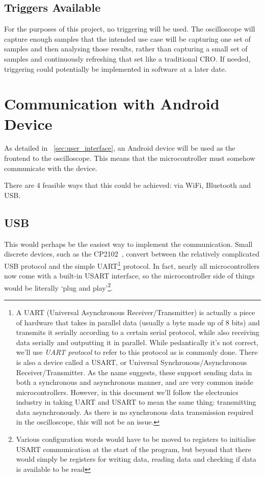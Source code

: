 \subsection*{Triggers Available}

For the purposes of this project, no triggering will be used. The oscilloscope
will capture enough samples that the intended use case will be capturing one set
of samples and then analysing those results, rather than capturing a small set
of samples and continuously refreshing that set like a traditional CRO. If
needed, triggering could potentially be implemented in software at a later date.

\section{Communication with Android Device}
\label{sec:CommOptions}

As detailed in ~\cref{sec:user_interface}, an Android device will be used as the
frontend to the oscilloscope. This means that the microcontroller must somehow
communicate with the device.

There are 4 feasible ways that this could be achieved: via WiFi, Bluetooth and
USB.

\subsection*{USB}

This would perhaps be the easiest way to implement the communication. Small
discrete devices, such as the CP2102~\autocite{CP2102}, convert between the
relatively complicated USB protocol and the simple UART\footnote{A UART
(Universal Asynchronous Receiver/Transmitter) is actually a piece of hardware
that takes in parallel data (usually a byte made up of 8 bits) and transmits it
serially according to a certain serial protocol, while also receiving data
serially and outputting it in parallel. While pedantically it's not correct,
we'll use \textit{UART protocol} to refer to this protocol as is commonly done.
There is also a device called a USART, or Universal Synchronous/Asynchronous
Receiver/Transmitter. As the name suggests, these support sending data in both a
synchronous and asynchronous manner, and are very common inside
microcontrollers. However, in this document we'll follow the electronics
industry in taking UART and USART to mean the same thing: transmitting data
asynchronously. As there is no synchronous data transmission required in the
oscilloscope, this will not be an issue.} protocol. In fact, nearly all
microcontrollers now come with a built-in USART interface, so the
microcontroller side of things would be literally `plug and
play'\footnote{Various configuration words would have to be moved to registers
to initialise USART communication at the start of the program, but beyond that
there would simply be registers for writing data, reading data and checking if
data is available to be read}.

